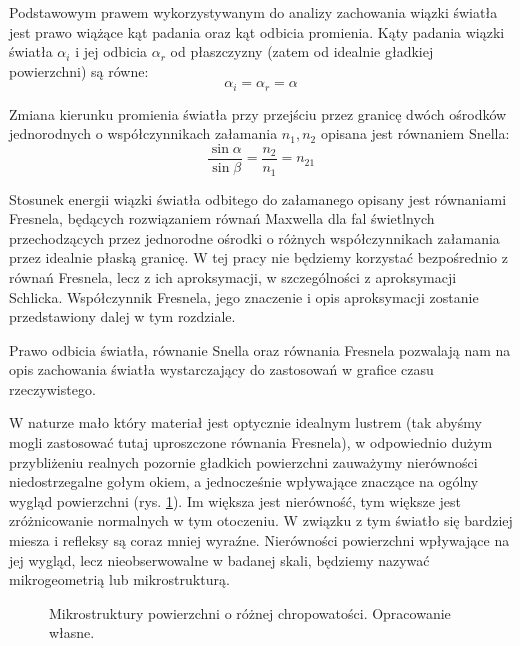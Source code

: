 \documentclass[../main.tex]{subfiles}
\begin{document}
Podstawowym prawem wykorzystywanym do analizy zachowania wiązki światła jest prawo wiążące kąt padania oraz kąt odbicia promienia. Kąty padania wiązki światła $\alpha_i$ i jej odbicia $\alpha_r$ od płaszczyzny (zatem od idealnie gładkiej powierzchni) są równe:
\begin{equation}
\alpha_i = \alpha_r = \alpha
\label{eq:pbr_reflection_law}
\end{equation}

Zmiana kierunku promienia światła przy przejściu przez granicę dwóch ośrodków jednorodnych o współczynnikach załamania $n_1, n_2$ opisana jest równaniem Snella:
\begin{equation}
\frac{\sin\alpha}{\sin\beta} =
  \frac{n_2}{n_1} = n_{21}
\label{eq:pbr_snell_law}
\end{equation}

Stosunek energii wiązki światła odbitego do załamanego opisany jest równaniami Fresnela, będących rozwiązaniem równań Maxwella dla fal świetlnych przechodzących przez jednorodne ośrodki o różnych współczynnikach załamania przez idealnie płaską granicę. W tej pracy nie będziemy korzystać bezpośrednio z równań Fresnela, lecz z ich aproksymacji, w szczególności z aproksymacji Schlicka. Współczynnik Fresnela, jego znaczenie i opis aproksymacji zostanie przedstawiony dalej w tym rozdziale.

Prawo odbicia światła, równanie Snella oraz równania Fresnela pozwalają nam na opis zachowania światła wystarczający do zastosowań w grafice czasu rzeczywistego.

W naturze mało który materiał jest optycznie idealnym lustrem (tak abyśmy mogli zastosować tutaj uproszczone równania Fresnela), w odpowiednio dużym przybliżeniu realnych pozornie gładkich powierzchni zauważymy nierówności niedostrzegalne gołym okiem, a jednocześnie wpływające znaczące na ogólny wygląd powierzchni (rys. \ref{fig:Microstructure}). Im większa jest nierówność, tym większe jest zróżnicowanie normalnych w tym otoczeniu. W związku z tym światło się bardziej miesza i refleksy są coraz mniej wyraźne. Nierówności powierzchni wpływające na jej wygląd, lecz nieobserwowalne w badanej skali, będziemy nazywać mikrogeometrią lub mikrostrukturą.

\begin{figure}[ht]
  \centering
  \hspace{0.5cm}
  \vspace{0.25cm}
  \caption{Mikrostruktury powierzchni o różnej chropowatości. Opracowanie własne.}
	\label{fig:Microstructure}
\end{figure}
\end{document}
